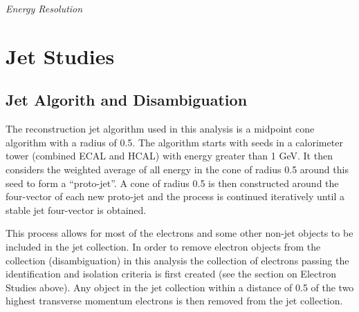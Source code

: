 \documentclass{cmspaper}
\begin{document}

{\Large \sl Energy Resolution}


\section{Jet Studies}

\subsection{Jet Algorith and Disambiguation}

The reconstruction jet algorithm used in this analysis is a midpoint cone algorithm with a radius of 0.5.  The algorithm starts with seeds in a calorimeter tower (combined ECAL and HCAL) with energy greater than 1 GeV. It then considers the weighted average of all energy in the cone of radius 0.5 around this seed to form a ``proto-jet''.  A cone of radius 0.5 is then constructed around the four-vector of each new proto-jet and the process is continued iteratively until a stable jet four-vector is obtained.

This process allows for most of the electrons and some other non-jet objects to be included in the jet collection.  In order to remove electron objects from the collection (disambiguation) in this analysis the collection of electrons passing the identification and isolation criteria is first created (see the section on Electron Studies above).  Any object in the jet collection within a distance of 0.5 of the two highest transverse momentum electrons is then removed from the jet collection.


\end{document}
